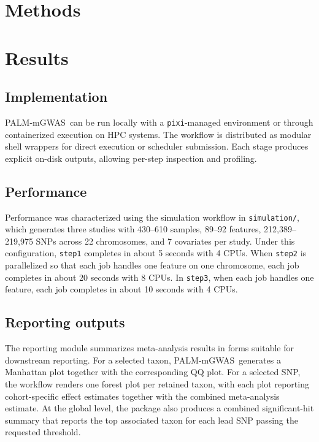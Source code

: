 \documentclass[10pt,twocolumn]{article}
\newcommand{\software}{PALM-mGWAS}
\begin{document}
\section{Methods}

\section{Results}
\subsection{Implementation}
\software\ can be run locally with a \texttt{pixi}-managed environment or through containerized execution on HPC systems. The workflow is distributed as modular shell wrappers for direct execution or scheduler submission. Each stage produces explicit on-disk outputs, allowing per-step inspection and profiling.

\subsection{Performance}
Performance was characterized using the simulation workflow in \texttt{simulation/}, which generates three studies with 430--610 samples, 89--92 features, 212,389--219,975 SNPs across 22 chromosomes, and 7 covariates per study. Under this configuration, \texttt{step1} completes in about 5 seconds with 4 CPUs. When \texttt{step2} is parallelized so that each job handles one feature on one chromosome, each job completes in about 20 seconds with 8 CPUs. In \texttt{step3}, when each job handles one feature, each job completes in about 10 seconds with 4 CPUs.

\subsection{Reporting outputs}
The reporting module summarizes meta-analysis results in forms suitable for downstream reporting. For a selected taxon, \software\ generates a Manhattan plot together with the corresponding QQ plot. For a selected SNP, the workflow renders one forest plot per retained taxon, with each plot reporting cohort-specific effect estimates together with the combined meta-analysis estimate. At the global level, the package also produces a combined significant-hit summary that reports the top associated taxon for each lead SNP passing the requested threshold.
\end{document}
